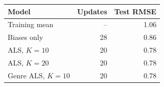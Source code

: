 \begin{tabular*}{\linewidth}{@{\extracolsep{\fill}}lrr}
\toprule
Model & Updates & Test RMSE \\
\midrule
Training mean & -- & 1.06 \\
Biases only & 28 & 0.86 \\
ALS, $K=10$ & 20 & 0.78 \\
ALS, $K=20$ & 20 & 0.78 \\
Genre ALS, $K=10$ & 20 & 0.78 \\
\bottomrule
\end{tabular*}
